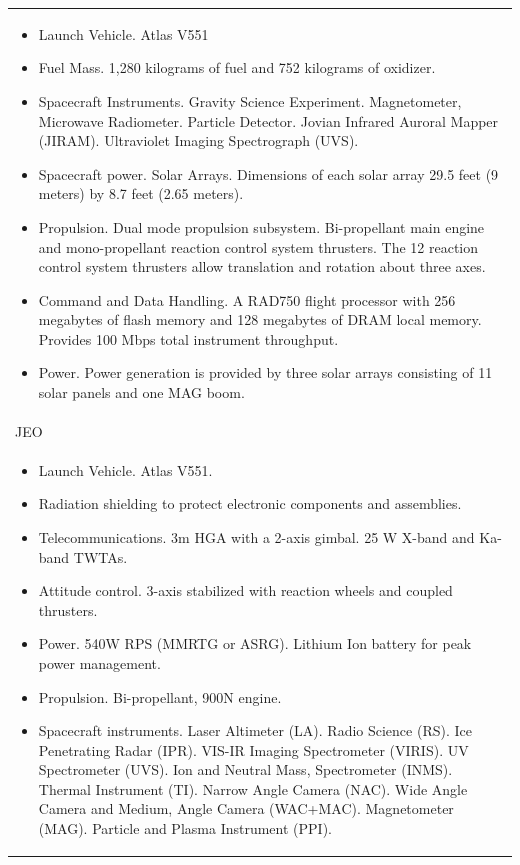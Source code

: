 \begin{longtable}{p{}}
  \begin{itemize}
  \item Launch Vehicle. Atlas V551
  \item Fuel Mass. 1,280 kilograms of fuel and 752 kilograms of
    oxidizer.
  \item Spacecraft Instruments. Gravity Science Experiment.
    Magnetometer, Microwave Radiometer. Particle Detector. Jovian
    Infrared Auroral Mapper (JIRAM). Ultraviolet Imaging Spectrograph
    (UVS).
  \item Spacecraft power. Solar Arrays. Dimensions of each solar array
    29.5 feet (9 meters) by 8.7 feet (2.65 meters).
  \item Propulsion. Dual mode propulsion subsystem. Bi-propellant main
    engine and mono-propellant reaction control system thrusters. The
    12 reaction control system thrusters allow translation and
    rotation about three axes.
  \item Command and Data Handling. A RAD750 flight processor with 256
    megabytes of flash memory and 128 megabytes of DRAM local
    memory. Provides 100 Mbps total instrument throughput.
  \item Power. Power generation is provided by three solar arrays
    consisting of 11 solar panels and one MAG boom.
  \end{itemize} \\

  JEO \\* \midrule

  \begin{itemize}
  \item Launch Vehicle. Atlas V551.
  \item Radiation shielding to protect electronic components and
    assemblies.
  \item Telecommunications. 3m HGA with a 2-axis gimbal. 25 W X-band
    and Ka-band TWTAs.
  \item Attitude control. 3-axis stabilized with reaction wheels and
    coupled thrusters.
  \item Power. 540W RPS (MMRTG or ASRG). Lithium Ion battery for peak
    power management.
  \item Propulsion. Bi-propellant, 900N engine.
  \item Spacecraft instruments. Laser Altimeter (LA). Radio Science
    (RS). Ice Penetrating Radar (IPR).  VIS-IR Imaging Spectrometer
    (VIRIS).  UV Spectrometer (UVS).  Ion and Neutral Mass,
    Spectrometer (INMS).  Thermal Instrument (TI).  Narrow Angle
    Camera (NAC).  Wide Angle Camera and Medium, Angle Camera
    (WAC+MAC).  Magnetometer (MAG).  Particle and Plasma Instrument
    (PPI).
  \end{itemize} \\


\end{longtable}
